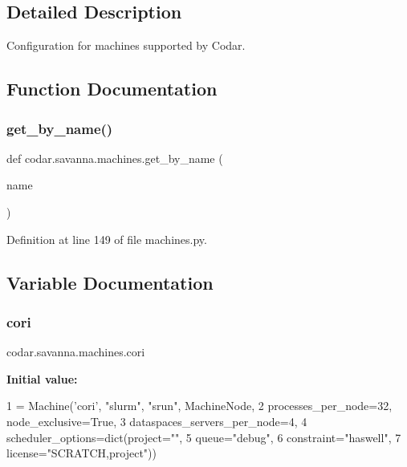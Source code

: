 \subsection{Detailed Description}
\begin{DoxyVerb}Configuration for machines supported by Codar.
\end{DoxyVerb}
 

\subsection{Function Documentation}
\mbox{\label{namespacecodar_1_1savanna_1_1machines_ac40865c4cf034c7fa8326851739415c4}} 
\subsubsection{\texorpdfstring{get\+\_\+by\+\_\+name()}{get\_by\_name()}}
{\footnotesize\ttfamily def codar.\+savanna.\+machines.\+get\+\_\+by\+\_\+name (\begin{DoxyParamCaption}\item[{}]{name }\end{DoxyParamCaption})}



Definition at line 149 of file machines.\+py.



\subsection{Variable Documentation}
\mbox{\label{namespacecodar_1_1savanna_1_1machines_ae762bc41067e70cd1eba556e01af93fa}} 
\subsubsection{\texorpdfstring{cori}{cori}}
{\footnotesize\ttfamily codar.\+savanna.\+machines.\+cori}

{\bfseries Initial value\+:}
\begin{DoxyCode}
1 =  Machine(\textcolor{stringliteral}{'cori'}, \textcolor{stringliteral}{"slurm"}, \textcolor{stringliteral}{"srun"}, MachineNode,
2                processes\_per\_node=32, node\_exclusive=\textcolor{keyword}{True},
3                dataspaces\_servers\_per\_node=4,
4                scheduler\_options=dict(project=\textcolor{stringliteral}{""},
5                                       queue=\textcolor{stringliteral}{"debug"},
6                                       constraint=\textcolor{stringliteral}{"haswell"},
7                                       license=\textcolor{stringliteral}{"SCRATCH,project"}))
\end{DoxyCode}


